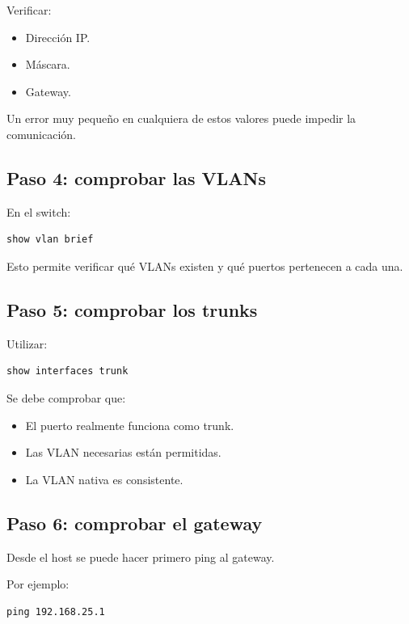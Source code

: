 \documentclass[12pt]{article}
\begin{document}
Verificar:

\begin{itemize}
    \item Dirección IP.
    \item Máscara.
    \item Gateway.
\end{itemize}

Un error muy pequeño en cualquiera de estos valores puede impedir la
comunicación.


\subsection{Paso 4: comprobar las VLANs}

En el switch:

\begin{lstlisting}
show vlan brief
\end{lstlisting}

Esto permite verificar qué VLANs existen y qué puertos pertenecen a cada
una.


\subsection{Paso 5: comprobar los trunks}

Utilizar:

\begin{lstlisting}
show interfaces trunk
\end{lstlisting}

Se debe comprobar que:

\begin{itemize}
    \item El puerto realmente funciona como trunk.
    \item Las VLAN necesarias están permitidas.
    \item La VLAN nativa es consistente.
\end{itemize}


\subsection{Paso 6: comprobar el gateway}

Desde el host se puede hacer primero ping al gateway.

Por ejemplo:

\begin{lstlisting}
ping 192.168.25.1
\end{lstlisting}
\end{document}
